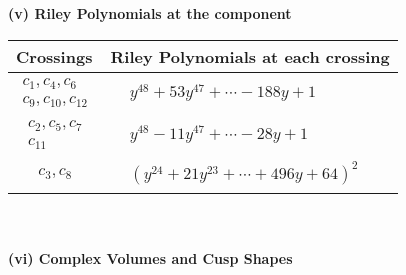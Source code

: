 \documentclass[1p]{elsarticle_modified}
\theoremstyle{definition}
\begin{document}
\newpage\renewcommand{\arraystretch}{1}
\flushleft \textbf{(v) Riley Polynomials at the component}\newline \\
\begin{tabular}{m{50pt}|m{274pt}}
Crossings & \hspace{64pt}Riley Polynomials at each crossing \\
\hline $$\begin{aligned}c_{1},c_{4},c_{6}\\c_{9},c_{10},c_{12}\end{aligned}$$&$\begin{aligned}
&y^{48}+53 y^{47}+\cdots-188 y+1
\end{aligned}$\\
\hline $$\begin{aligned}c_{2},c_{5},c_{7}\\c_{11}\end{aligned}$$&$\begin{aligned}
&y^{48}-11 y^{47}+\cdots-28 y+1
\end{aligned}$\\
\hline $$\begin{aligned}c_{3},c_{8}\end{aligned}$$&$\begin{aligned}
&(y^{24}+21 y^{23}+\cdots+496 y+64)^{2}
\end{aligned}$\\
\hline
\end{tabular}\\~\\
\newpage\flushleft \textbf{(vi) Complex Volumes and Cusp Shapes}
\end{document}
